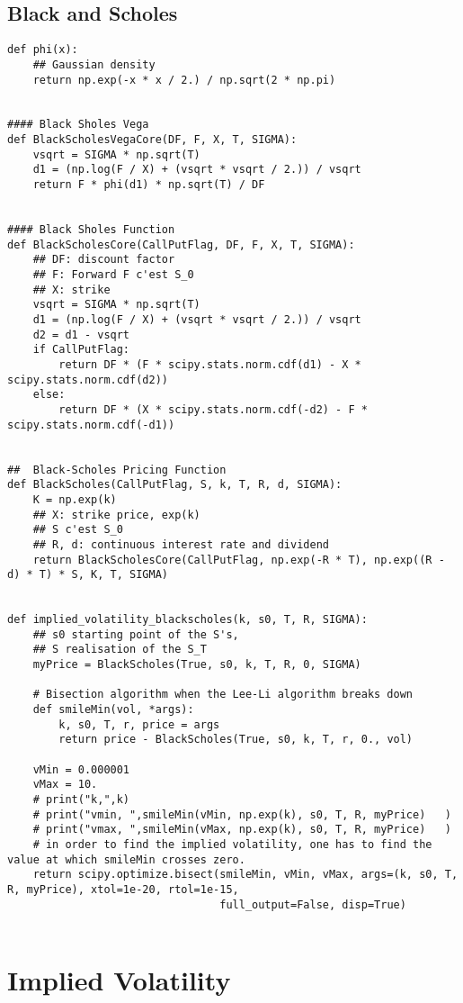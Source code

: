 \subsection{Black and Scholes}
\begin{Verbatim}[fontsize=\tiny]
def phi(x):
    ## Gaussian density
    return np.exp(-x * x / 2.) / np.sqrt(2 * np.pi)


#### Black Sholes Vega
def BlackScholesVegaCore(DF, F, X, T, SIGMA):
    vsqrt = SIGMA * np.sqrt(T)
    d1 = (np.log(F / X) + (vsqrt * vsqrt / 2.)) / vsqrt
    return F * phi(d1) * np.sqrt(T) / DF


#### Black Sholes Function
def BlackScholesCore(CallPutFlag, DF, F, X, T, SIGMA):
    ## DF: discount factor
    ## F: Forward F c'est S_0
    ## X: strike
    vsqrt = SIGMA * np.sqrt(T)
    d1 = (np.log(F / X) + (vsqrt * vsqrt / 2.)) / vsqrt
    d2 = d1 - vsqrt
    if CallPutFlag:
        return DF * (F * scipy.stats.norm.cdf(d1) - X * scipy.stats.norm.cdf(d2))
    else:
        return DF * (X * scipy.stats.norm.cdf(-d2) - F * scipy.stats.norm.cdf(-d1))


##  Black-Scholes Pricing Function
def BlackScholes(CallPutFlag, S, k, T, R, d, SIGMA):
    K = np.exp(k)
    ## X: strike price, exp(k)
    ## S c'est S_0
    ## R, d: continuous interest rate and dividend
    return BlackScholesCore(CallPutFlag, np.exp(-R * T), np.exp((R - d) * T) * S, K, T, SIGMA)


def implied_volatility_blackscholes(k, s0, T, R, SIGMA):
    ## s0 starting point of the S's,
    ## S realisation of the S_T
    myPrice = BlackScholes(True, s0, k, T, R, 0, SIGMA)

    # Bisection algorithm when the Lee-Li algorithm breaks down
    def smileMin(vol, *args):
        k, s0, T, r, price = args
        return price - BlackScholes(True, s0, k, T, r, 0., vol)

    vMin = 0.000001
    vMax = 10.
    # print("k,",k)
    # print("vmin, ",smileMin(vMin, np.exp(k), s0, T, R, myPrice)   )
    # print("vmax, ",smileMin(vMax, np.exp(k), s0, T, R, myPrice)   )
    # in order to find the implied volatility, one has to find the value at which smileMin crosses zero.
    return scipy.optimize.bisect(smileMin, vMin, vMax, args=(k, s0, T, R, myPrice), xtol=1e-20, rtol=1e-15,
                                 full_output=False, disp=True)
                                 
\end{Verbatim}

\section{Implied Volatility}

